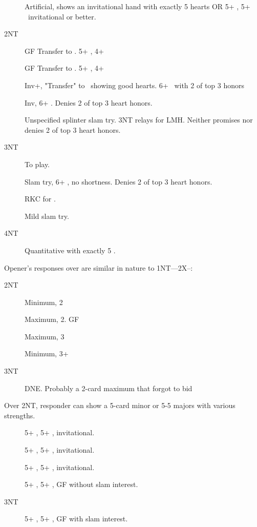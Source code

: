 \documentclass[tom-ari]{subfiles}
\begin{document}
\begin{description}
  \item[] Artificial, shows an invitational hand with exactly 5 hearts OR 5+ \heartsuit, 5+ \spadesuit ~invitational or better.
  \item[2NT] GF Transfer to \clubsuit. 5+ \heartsuit, 4+ \clubsuit
  \item[] GF Transfer to \diamondsuit. 5+ \heartsuit, 4+ \diamondsuit
  \item[] Inv+, "Transfer" to \heartsuit ~showing good hearts. 6+ \heartsuit ~with 2 of top 3 honors
  \item[] Inv, 6+ \heartsuit. Denies 2 of top 3 heart honors.
  \item[] Unspecified splinter slam try. 3NT relays for LMH. Neither promises nor denies 2 of top 3 heart honors.
  \item[3NT] To play.
  \item[] Slam try, 6+ \heartsuit, no shortness. Denies 2 of top 3 heart honors.
  \item[] RKC for \heartsuit.
  \item[] Mild slam try. 
  \item[4NT] Quantitative with exactly 5 \heartsuit.
\end{description}

Opener's responses over  are similar in nature to 1NT----2X--:

\begin{description}
  \item[2NT] Minimum, 2\heartsuit
  \item[] Maximum, 2\heartsuit. GF
  \item[] Maximum, 3\heartsuit
  \item[] Minimum, 3+ \heartsuit
  \item[3NT] DNE. Probably a 2-card maximum that forgot to bid 
\end{description}

Over 2NT, responder can show a 5-card minor or 5-5 majors with various strengths.

\begin{description}
  \item[] 5+ \heartsuit, 5+ \clubsuit, invitational.
  \item[] 5+ \heartsuit, 5+ \diamondsuit, invitational.
  \item[] 5+ \heartsuit, 5+ \spadesuit, invitational.
  \item[] 5+ \heartsuit, 5+ \spadesuit, GF without slam interest.
  \item[3NT] 5+ \heartsuit, 5+ \spadesuit, GF with slam interest.
\end{description}
\end{document}
